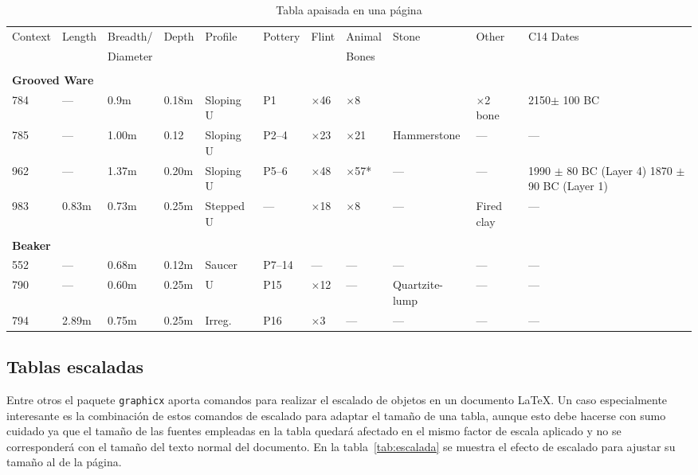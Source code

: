 \documentclass[11pt,a4paper]{article}
\begin{document}
\begin{sidewaystable}
	\centering
	\caption[Ejemplo de tabla apaisada]{Tabla apaisada en una página}\label{tab:apaisada}
	\begin{tabular}{|llllllllp{1in}lp{1in}|}
		\hline
		Context   &Length   &Breadth/   &Depth   &Profile   &Pottery   &Flint   &Animal   &Stone   &Other    &C14 Dates \\
		&         &Diameter   &        &          &          &        & 
		Bones&&&\\
		\hline
		&&&&&&&&&&\\
		\multicolumn{10}{|l}{\bf Grooved Ware}&\\
		784       &---        &0.9m       &0.18m   &Sloping U &P1       &$\times$46  &  $\times$8      &&       $\times$2 bone&  2150$\pm$ 100 BC\\
		785       &---        &1.00m      &0.12    &Sloping U &P2--4    &$\times$23  &  $\times$21     & Hammerstone &---&---\\
		962       &---        &1.37m      &0.20m   &Sloping U &P5--6    &$\times$48  &  $\times$57*    & ---&     ---&1990 $\pm$ 80 BC (Layer 4) 1870 $\pm$90 BC (Layer 1)\\
		983       &0.83m      &0.73m      &0.25m   &Stepped U &---      &$\times$18  &  $\times$8      & ---& Fired clay&---\\
		&&&&&&&&&&\\
		\multicolumn{10}{|l}{\bf Beaker}&\\
		552       &---        &0.68m      &0.12m   &Saucer    &P7--14   &---           & ---       & ---       &---        &---\\
		790       &---        &0.60m      &0.25m   &U         &P15      &$\times$12    & ---       & Quartzite-lump&---    &---\\
		794       &2.89m      &0.75m      &0.25m   &Irreg.    &P16      &$\times$3     & ---       & ---       &---        &---\\
		\hline
	\end{tabular}
\end{sidewaystable}


\newpage
\subsection{Tablas escaladas}
Entre otros el paquete \texttt{graphicx} aporta comandos para realizar el escalado de objetos en un documento \LaTeX. Un caso especialmente interesante es la combinación de estos comandos de escalado para adaptar el tamaño de una tabla, aunque esto debe hacerse con sumo cuidado ya que el tamaño de las fuentes empleadas en la tabla quedará afectado en el mismo factor de escala aplicado y no se corresponderá con el tamaño del texto normal del documento. En la tabla~\ref{tab:escalada} se muestra el efecto de escalado para ajustar su tamaño al de la página.
\end{document}
